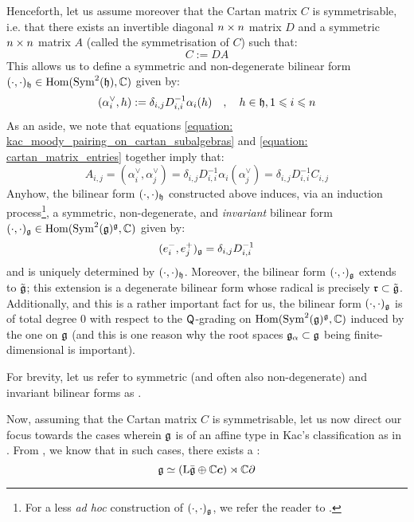         Henceforth, let us assume moreover that the Cartan matrix $C$ is symmetrisable, i.e. that there exists an invertible diagonal $n \x n$ matrix $D$ and a symmetric $n \x n$ matrix $A$ (called the symmetrisation of $C$) such that:
            $$C := DA$$
        This allows us to define a symmetric and non-degenerate bilinear form $(\cdot, \cdot)_{\mathfrak{h}} \in \operatorname{Hom}( \operatorname{Sym}^2(\mathfrak{h}), \mathbb{C} )$ given by:
            \begin{equation} \label{equation: kac_moody_pairing_on_cartan_subalgebras}
                ( \alpha_i^{\vee}, h ) := \delta_{i, j} D_{i, i}^{-1} \alpha_i(h) \quad, \quad h \in \mathfrak{h}, 1 \leqslant i \leqslant n
            \end{equation}
        As an aside, we note that equations \eqref{equation: kac_moody_pairing_on_cartan_subalgebras} and \eqref{equation: cartan_matrix_entries} together imply that:
            $$A_{i, j} = (\alpha_i^{\vee}, \alpha_j^{\vee}) = \delta_{i, j} D_{i, i}^{-1} \alpha_i( \alpha_j^{\vee} ) = \delta_{i, j} D_{i, i}^{-1} C_{i, j}$$
        Anyhow, the bilinear form $(\cdot, \cdot)_{\mathfrak{h}}$ constructed above induces, via an induction process\footnote{For a less \textit{ad hoc} construction of $(\cdot, \cdot)_{\mathfrak{g}}$, we refer the reader to \cite{neher_pianzola_prelat_sepp_invariant_bilinear_forms_via_fppf_descent}.}, a symmetric, non-degenerate, and \textit{invariant} bilinear form $(\cdot, \cdot)_{\mathfrak{g}} \in \operatorname{Hom}( \operatorname{Sym}^2(\mathfrak{g})^{\mathfrak{g}}, \mathbb{C} )$ given by:
            \begin{equation} \label{equation: kac_moody_pairing}
                ( e_i^-, e_j^+ )_{\mathfrak{g}} = \delta_{i, j} D_{i, i}^{-1}
            \end{equation}
        and is uniquely determined by $(\cdot, \cdot)_{\mathfrak{h}}$. Moreover, the bilinear form $(\cdot, \cdot)_{\mathfrak{g}}$ extends to $\tilde{\mathfrak{g}}$; this extension is a degenerate bilinear form whose radical is precisely $\mathfrak{r} \subset \tilde{\mathfrak{g}}$. Additionally, and this is a rather important fact for us, the bilinear form $(\cdot, \cdot)_{\mathfrak{g}}$ is of total degree $0$ with respect to the $\mathsf{Q}$-grading on $\operatorname{Hom}( \operatorname{Sym}^2(\mathfrak{g})^{\mathfrak{g}}, \mathbb{C} )$ induced by the one on $\mathfrak{g}$ (and this is one reason why the root spaces $\mathfrak{g}_{\alpha} \subset \mathfrak{g}$ being finite-dimensional is important).
        \begin{convention}
            For brevity, let us refer to symmetric (and often also non-degenerate) and invariant bilinear forms as .
        \end{convention}

        Now, assuming that the Cartan matrix $C$ is symmetrisable, let us now direct our focus towards the cases wherein $\mathfrak{g}$ is of an affine type in Kac's classification as in \cite[Chapter 4]{kac_infinite_dimensional_lie_algebras}. From \cite[Chapter 7]{kac_infinite_dimensional_lie_algebras}, we know that in such cases, there exists a :
            $$\mathfrak{g} \simeq ( \mathrm{L} \bar{\mathfrak{g}} \oplus \mathbb{C} \boldsymbol{c} ) \rtimes \mathbb{C} \partial$$

